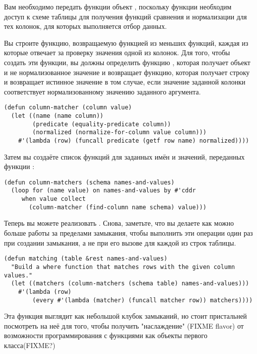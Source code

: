 Вам необходимо передать функции  объект , поскольку функции
необходим доступ к схеме таблицы для получения функций сравнения и нормализации для тех
колонок, для которых выполняется отбор данных.

Вы строите функцию, возвращаемую функцией  из меньших функций, каждая из
которые отвечает за проверку значения одной из колонок.  Для того, чтобы создать эти
функции, вы должны определить функцию , которая получает объект
 и не нормализованное значение и возвращает функцию, которая получает строку
и возвращает истинное значение в том случае, если значение заданной колонки соответствует
нормализованному значению заданного аргумента.

\begin{lstlisting}
(defun column-matcher (column value)
  (let ((name (name column))
        (predicate (equality-predicate column))
        (normalized (normalize-for-column value column)))
    #'(lambda (row) (funcall predicate (getf row name) normalized))))
\end{lstlisting}

Затем вы создаёте список функций  для заданных имён и значений,
переданных функции :

\begin{lstlisting}
(defun column-matchers (schema names-and-values)
  (loop for (name value) on names-and-values by #'cddr
     when value collect
       (column-matcher (find-column name schema) value)))
\end{lstlisting}

Теперь вы можете реализовать .  Снова, заметьте, что вы делаете как можно
больше работы за пределами замыкания, чтобы выполнить эти операции один раз при создании
замыкания, а не при его вызове для каждой из строк таблицы.

\begin{lstlisting}
(defun matching (table &rest names-and-values)
  "Build a where function that matches rows with the given column values."
  (let ((matchers (column-matchers (schema table) names-and-values)))
    #'(lambda (row)
        (every #'(lambda (matcher) (funcall matcher row)) matchers))))
\end{lstlisting}

Эта функция выглядит как небольшой клубок замыканий, но стоит пристальней посмотреть на
неё для того, чтобы получить "наслаждение" (FIXME flavor) от возможности программирования
с функциями как объекты первого класса(FIXME?)

